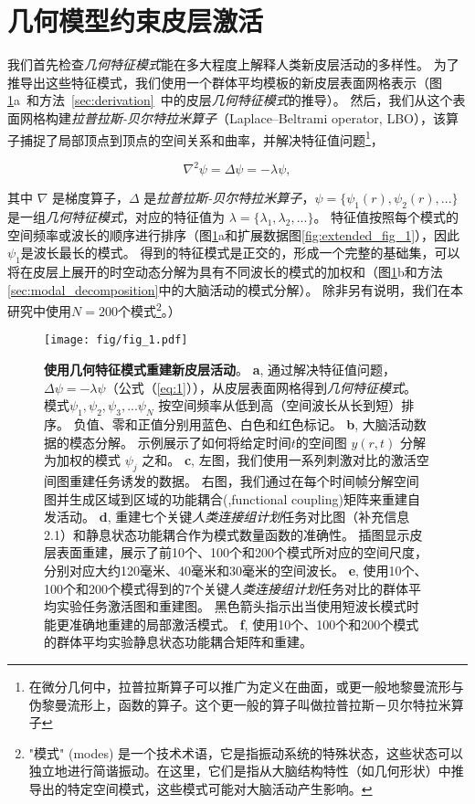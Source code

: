 \documentclass[lang=cn,a4paper,newtx]{elegantpaper}
\begin{document}
\section{几何模型约束皮层激活}
我们首先检查\textit{几何特征模式}能在多大程度上解释人类新皮层活动的多样性。
为了推导出这些特征模式，我们使用一个群体平均模板的新皮层表面网格表示（图\ref{fig:1}a~和方法~\ref{sec:derivation}~中的皮层\textit{几何特征模式}的推导）。
然后，我们从这个表面网格构建\textit{拉普拉斯-贝尔特拉米算子}（Laplace–Beltrami operator, LBO），该算子捕捉了局部顶点到顶点的空间关系和曲率，并解决特征值问题\footnote{在微分几何中，拉普拉斯算子可以推广为定义在曲面，或更一般地黎曼流形与伪黎曼流形上，函数的算子。这个更一般的算子叫做拉普拉斯－贝尔特拉米算子}，

\begin{equation} \label{eq:1}
	\nabla^2 \psi = \Delta\psi = -\lambda \psi,
\end{equation}


其中 $ \nabla $ 是梯度算子，$ \Delta $ 是\textit{拉普拉斯-贝尔特拉米算子}，$ \psi = \{\psi_1(r), \psi_2(r),...\} $ 是一组\textit{几何特征模式}，对应的特征值为 $ \lambda = \{ \lambda_1, \lambda_2, ... \} $。
特征值按照每个模式的空间频率或波长的顺序进行排序（图\ref{fig:1}a和扩展数据图\ref{fig:extended_fig_1}），因此$ \psi_1 $是波长最长的模式。
得到的特征模式是正交的，形成一个完整的基础集，可以将在皮层上展开的时空动态分解为具有不同波长的模式的加权和（图\ref{fig:1}b和方法\ref{sec:modal_decomposition}中的大脑活动的模式分解）。
除非另有说明，我们在本研究中使用$ N = 200 $个模式\footnote{"模式" (modes) 是一个技术术语，它是指振动系统的特殊状态，这些状态可以独立地进行简谐振动。在这里，它们是指从大脑结构特性（如几何形状）中推导出的特定空间模式，这些模式可能对大脑活动产生影响。}。）


\begin{figure}[!htb]
	\centering
	\texttt{[image: fig/fig\_1.pdf]}
	\caption{\textbf{使用几何特征模式重建新皮层活动}。
	\textbf{a}, 通过解决特征值问题，$ \Delta \psi = -\lambda \psi $（公式（\ref{eq:1}）），从皮层表面网格得到\textit{几何特征模式}。
	模式$ \psi_1, \psi_2, \psi_3, ... \psi_N $ 按空间频率从低到高（空间波长从长到短）排序。
	负值、零和正值分别用蓝色、白色和红色标记。
	\textbf{b}, 大脑活动数据的模态分解。
	示例展示了如何将给定时间$ t $的空间图 $ y(r,t) $ 分解为加权的模式 $ \psi_j $ 之和。
	\textbf{c}, 左图，我们使用一系列刺激对比的激活空间图重建任务诱发的数据。
	右图，我们通过在每个时间帧分解空间图并生成区域到区域的功能耦合(,functional coupling)矩阵来重建自发活动。
	\textbf{d}, 重建七个关键\textit{人类连接组计划}任务对比图（补充信息2.1）和静息状态功能耦合作为模式数量函数的准确性。
	插图显示皮层表面重建，展示了前10个、100个和200个模式所对应的空间尺度，分别对应大约120毫米、40毫米和30毫米的空间波长。
	 \textbf{e}, 使用10个、100个和200个模式得到的7个关键\textit{人类连接组计划}任务对比的群体平均实验任务激活图和重建图。 %
	 黑色箭头指示出当使用短波长模式时能更准确地重建的局部激活模式。 
	 \textbf{f}, 使用10个、100个和200个模式的群体平均实验静息状态功能耦合矩阵和重建。
	} \label{fig:1}
\end{figure}
\end{document}
